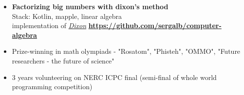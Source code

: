 \documentclass[10pt, a4paper]{report}
\begin{document}
\begin{itemize}
        \item \textbf{Factorizing big numbers with dixon's method}\\
        Stack: Kotlin, mapple, linear algebra\\
        implementation of \href{https://en.wikipedia.org/wiki/Dixon\%27s_factorization_method}{\textit{Dixon}}
        \textbf{
        \url{https://github.com/sergalb/computer-algebra}
        }

        \item Prize-winning in math olympiads - "Rosatom", "Phisteh", "OMMO", "Future researchers - the future of science"
        \item 3 years volunteering on NERC ICPC final (semi-final of whole world programming competition)
    \end{itemize}
\end{document}
